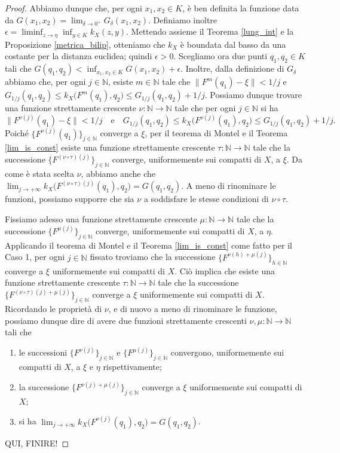 \begin{proof}
    Abbiamo dunque che, per ogni $x_1,x_2 \in K$, è ben definita la funzione data da $\displaystyle G(x_1,x_2)=\lim_{\delta\longrightarrow 0^+}G_\delta(x_1,x_2)$. Definiamo inoltre $\displaystyle \epsilon=\liminf_{z \longrightarrow\eta}\inf_{y\in K}k_X(z,y)$. Mettendo assieme il Teorema \ref{lung_int} e la Proposizione \ref{metrica_bilip}, otteniamo che $k_X$ è boundata dal basso da una costante per la distanza euclidea; quindi $\epsilon>0$. Scegliamo ora due punti $q_1,q_2 \in K$ tali che $\displaystyle G(q_1,q_2)<\inf_{x_1,x_2\in K}G(x_1,x_2)+\epsilon$. Inoltre, dalla definizione di $G_{\delta}$ abbiamo che, per ogni $j\in\mathbb{N}$, esiste $m\in\mathbb{N}$ tale che $\|F^m(q_1)-\xi\|<1/j$ e $G_{1/j}(q_1,q_2) \le k_X\big(F^m(q_1),q_2\big) \le G_{1/j}(q_1,q_2)+1/j$. Possiamo dunque trovare una funzione strettamente crescente $\nu:\mathbb{N}\longrightarrow\mathbb{N}$ tale che per ogni $j\in\mathbb{N}$ si ha
    $$\|F^{\nu(j)}(q_1)-\xi\|<1/j \quad\text{e}\quad G_{1/j}(q_1,q_2) \le k_X\big(F^{\nu(j)}(q_1),q_2\big) \le G_{1/j}(q_1,q_2)+1/j.$$
    Poiché $\{F^{\nu(j)}(q_1)\}_{j\in\mathbb{N}}$ converge a $\xi$, per il teorema di Montel e il Teorema \ref{lim_is_const} esiste una funzione strettamente crescente $\tau:\mathbb{N}\longrightarrow\mathbb{N}$ tale che la successione $\{F^{(\nu\circ\tau)(j)}\}_{j\in\mathbb{N}}$ converge, uniformemente sui compatti di $X$, a $\xi$. Da come è stata scelta $\nu$, abbiamo anche che $\displaystyle\lim_{j\longrightarrow+\infty}k_X\big(F^{(\nu\circ\tau)(j)}(q_1),q_2\big)=G(q_1,q_2)$. A meno di rinominare le funzioni, possiamo supporre che sia $\nu$ a soddisfare le stesse condizioni di $\nu\circ\tau$.

    Fissiamo adesso una funzione strettamente crescente $\mu:\mathbb{N}\longrightarrow\mathbb{N}$ tale che la successione $\{F^{\mu(j)}\}_{j\in\mathbb{N}}$ converge, uniformemente sui compatti di $X$, a $\eta$. Applicando il teorema di Montel e il Teorema \ref{lim_is_const} come fatto per il Caso 1, per ogni $j\in\mathbb{N}$ fissato troviamo che la successione $\{F^{\nu(h)+\mu(j)}\}_{h\in\mathbb{N}}$ converge a $\xi$ uniformemente sui compatti di $X$. Ciò implica che esiste una funzione strettamente crescente $\tau:\mathbb{N}\longrightarrow\mathbb{N}$ tale che la successione $\{F^{(\nu\circ\tau)(j)+\mu(j)}\}_{j\in\mathbb{N}}$ converge a $\xi$ uniformemente sui compatti di $X$. Ricordando le proprietà di $\nu$, e di nuovo a meno di rinominare le funzione, possiamo dunque dire di avere due funzioni strettamente crescenti $\nu,\mu:\mathbb{N}\longrightarrow\mathbb{N}$ tali che
    \begin{enumerate}[label={(\arabic*)}]
        \item le successioni $\{F^{\nu(j)}\}_{j\in\mathbb{N}}$ e $\{F^{\mu(j)}\}_{j\in\mathbb{N}}$ convergono, uniformemente sui compatti di $X$, a $\xi$ e $\eta$ rispettivamente;
        \item la successione $\{F^{\nu(j)+\mu(j)}\}_{j\in\mathbb{N}}$ converge a $\xi$ uniformemente sui compatti di $X$;
        \item si ha $\displaystyle\lim_{j\longrightarrow+\infty}k_X\big(F^{\nu(j)}(q_1),q_2\big)=G(q_1,q_2)$.
    \end{enumerate}

    QUI, FINIRE!
\end{proof}